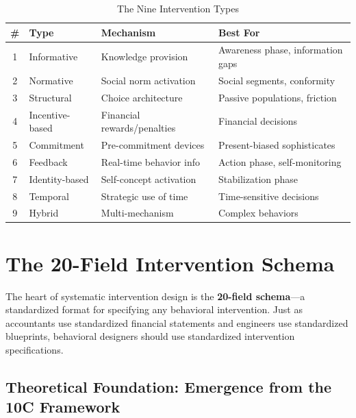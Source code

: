\begin{table}[htbp]
\centering
\caption{The Nine Intervention Types}
\label{tab:17-types-summary}
\renewcommand{\arraystretch}{1.3}
\small
\begin{tabular}{@{}clll@{}}
\toprule
\textbf{\#} & \textbf{Type} & \textbf{Mechanism} & \textbf{Best For} \\
\midrule
1 & Informative & Knowledge provision & Awareness phase, information gaps \\
2 & Normative & Social norm activation & Social segments, conformity \\
3 & Structural & Choice architecture & Passive populations, friction \\
4 & Incentive-based & Financial rewards/penalties & Financial decisions \\
5 & Commitment & Pre-commitment devices & Present-biased sophisticates \\
6 & Feedback & Real-time behavior info & Action phase, self-monitoring \\
7 & Identity-based & Self-concept activation & Stabilization phase \\
8 & Temporal & Strategic use of time & Time-sensitive decisions \\
9 & Hybrid & Multi-mechanism & Complex behaviors \\
\bottomrule
\end{tabular}
\end{table}


\section{The 20-Field Intervention Schema}
\label{sec:17-schema}

The heart of systematic intervention design is the \textbf{20-field schema}---a standardized format for specifying any behavioral intervention. Just as accountants use standardized financial statements and engineers use standardized blueprints, behavioral designers should use standardized intervention specifications.

\subsection{Theoretical Foundation: Emergence from the 10C Framework}
\label{sec:17-emergence}

